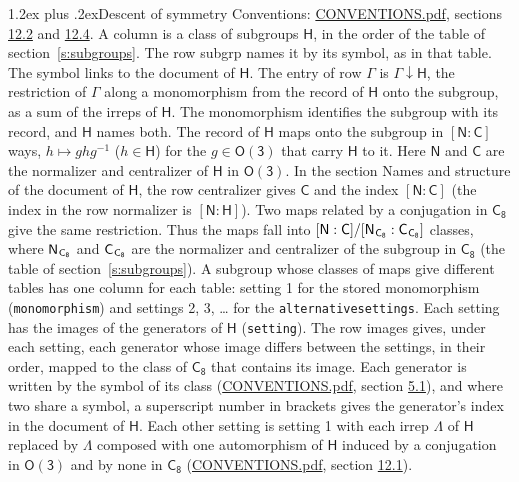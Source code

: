 \documentclass[10pt,a4paper]{article}
\makeatletter
\renewcommand\section{\@startsection{section}{1}{\z@}{-3ex plus -1ex minus -.2ex}%
  {1.2ex plus .2ex}{\normalfont\large\sffamily\bfseries\color{parttitle}}}
\numberwithin{equation}{section}
\newcommand{\grp}[1]{\mathsf{#1}}
\newcommand{\grpindex}[2]{[#1 : #2]}
\newcommand{\restr}[2]{#1\!\downarrow#2}
\newcommand{\hairsp}{\mkern1mu}
\makeatother
\begin{document}
\section{Descent of symmetry}\label{s:subduction}
Conventions: \href{../../CONVENTIONS.pdf}{CONVENTIONS.pdf}, sections \href{../../CONVENTIONS.pdf\#conv.12.2}{12.2} and \href{../../CONVENTIONS.pdf\#conv.12.4}{12.4}.
A column is a class of subgroups $\grp{H}$, in the order of the table of section~\ref{s:subgroups}. The row subgrp names it by its symbol, as in that table. The symbol links to the document of $\grp{H}$. The entry of row $\Gamma$ is $\restr{\Gamma}{\grp{H}}$, the restriction of $\Gamma$ along a monomorphism from the record of $\grp{H}$ onto the subgroup, as a sum of the irreps of $\grp{H}$. The monomorphism identifies the subgroup with its record, and $\grp{H}$ names both. \label{n:group.normalizer.o3}\label{n:group.centralizer.o3}The record of $\grp{H}$ maps onto the subgroup in $\grpindex{\grp{N}}{\grp{C}}$ ways, $h \mapsto g h g^{-1}$ ($h \in \grp{H}$) for the $g \in \grp{O(3)}$ that carry $\grp{H}$ to it. Here $\grp{N}$ and $\grp{C}$ are the normalizer and centralizer of $\grp{H}$ in \href{O3.pdf}{$\grp{O(3)}$}. In the section Names and structure of the document of $\grp{H}$, the row centralizer gives $\grp{C}$ and the index $\grpindex{\grp{N}}{\grp{C}}$ (the index in the row normalizer is $\grpindex{\grp{N}}{\grp{H}}$). Two maps related by a conjugation in $\grp{C_{8}}$ give the same restriction. Thus the maps fall into $\grpindex{\grp{N}}{\grp{C}}/\grpindex{\grp{N}_{\hairsp \grp{C_{8}}}}{\grp{C}_{\hairsp \grp{C_{8}}}}$ classes, where $\grp{N}_{\hairsp \grp{C_{8}}}$ and $\grp{C}_{\hairsp \grp{C_{8}}}$ are the normalizer and centralizer of the subgroup in $\grp{C_{8}}$ (the table of section~\ref{s:subgroups}). \label{n:head.setting}A subgroup whose classes of maps give different tables has one column for each table: setting 1 for the stored monomorphism (\texttt{monomorphism}) and settings 2, 3, \dots{} for the \texttt{alternativesettings}. Each setting has the images of the generators of $\grp{H}$ (\texttt{setting}). \label{n:head.images}The row images gives, under each setting, each generator whose image differs between the settings, in their order, mapped to the class of $\grp{C_{8}}$ that contains its image. Each generator is written by the symbol of its class (\href{../../CONVENTIONS.pdf}{CONVENTIONS.pdf}, section \href{../../CONVENTIONS.pdf\#conv.5.1}{5.1}), and where two share a symbol, a superscript number in brackets gives the generator's index in the document of $\grp{H}$. \label{n:irrep.Delta}Each other setting is setting 1 with each irrep $\Lambda$ of $\grp{H}$ replaced by $\Lambda$ composed with one automorphism of $\grp{H}$ induced by a conjugation in \href{O3.pdf}{$\grp{O(3)}$} and by none in $\grp{C_{8}}$ (\href{../../CONVENTIONS.pdf}{CONVENTIONS.pdf}, section \href{../../CONVENTIONS.pdf\#conv.12.1}{12.1}).
\end{document}
